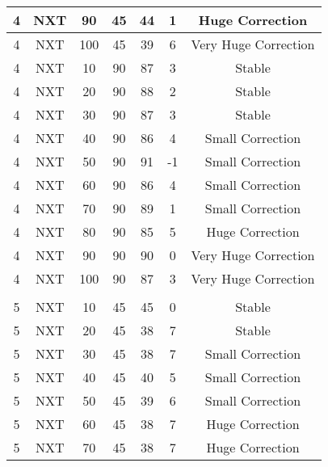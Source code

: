 \begin{longtable}[c]{|ccccccc|}
4  & NXT  & 90     & 45    & 44                & 1          & Huge Correction         \\\hline
4  & NXT  & 100    & 45    & 39                & 6          & Very Huge Correction    \\\hline
4  & NXT  & 10     & 90    & 87                & 3          & Stable                  \\\hline
4  & NXT  & 20     & 90    & 88                & 2          & Stable                  \\\hline
4  & NXT  & 30     & 90    & 87                & 3          & Stable                  \\\hline
4  & NXT  & 40     & 90    & 86                & 4          & Small Correction        \\\hline
4  & NXT  & 50     & 90    & 91                & -1         & Small Correction        \\\hline
4  & NXT  & 60     & 90    & 86                & 4          & Small Correction        \\\hline
4  & NXT  & 70     & 90    & 89                & 1          & Small Correction        \\\hline
4  & NXT  & 80     & 90    & 85                & 5          & Huge Correction         \\\hline
4  & NXT  & 90     & 90    & 90                & 0          & Very Huge Correction    \\\hline
4  & NXT  & 100    & 90    & 87                & 3          & Very Huge Correction    \\\hline
   &      &        &       &                   &            &                         \\\hline
5  & NXT  & 10     & 45    & 45                & 0          & Stable                  \\\hline
5  & NXT  & 20     & 45    & 38                & 7          & Stable                  \\\hline
5  & NXT  & 30     & 45    & 38                & 7          & Small Correction        \\\hline
5  & NXT  & 40     & 45    & 40                & 5          & Small Correction        \\\hline
5  & NXT  & 50     & 45    & 39                & 6          & Small Correction        \\\hline
5  & NXT  & 60     & 45    & 38                & 7          & Huge Correction         \\\hline
5  & NXT  & 70     & 45    & 38                & 7          & Huge Correction         \\\hline

\end{longtable}
